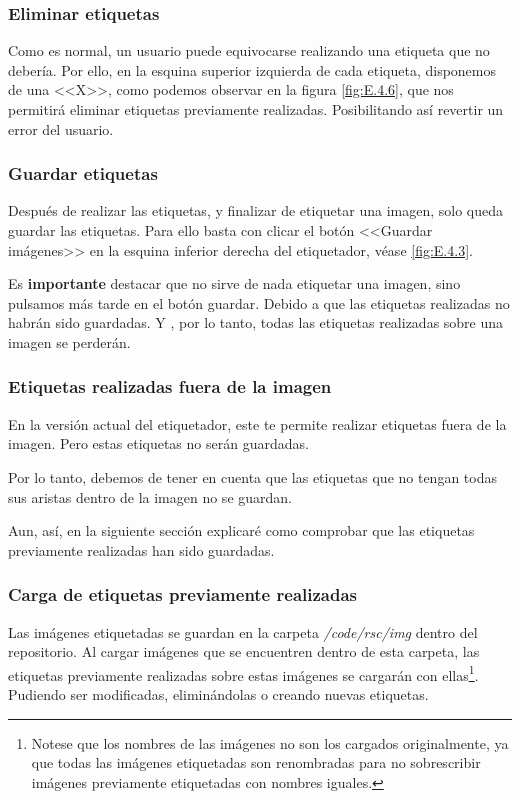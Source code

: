 \subsubsection{Eliminar etiquetas}

Como es normal, un usuario puede equivocarse realizando una etiqueta que no debería. Por ello, en la esquina superior izquierda de cada etiqueta, disponemos de una \textrm{<<X>>}, como podemos observar en la figura \ref{fig:E.4.6}, que nos permitirá eliminar etiquetas previamente realizadas. Posibilitando así revertir un error del usuario.

\subsubsection{Guardar etiquetas}
Después de realizar las etiquetas, y finalizar de etiquetar una imagen, solo queda guardar las etiquetas. Para ello basta con clicar el botón \textrm{<<Guardar imágenes>>} en la esquina inferior derecha del etiquetador, véase \ref{fig:E.4.3}.

Es \textbf{importante} destacar que no sirve de nada etiquetar una imagen, sino pulsamos más tarde en el botón guardar. Debido a que las etiquetas realizadas no habrán sido guardadas. Y 
, por lo tanto, todas las etiquetas realizadas sobre una imagen se perderán.

\subsubsection{Etiquetas realizadas fuera de la imagen}

En la versión actual del etiquetador, este te permite realizar etiquetas fuera de la imagen. Pero estas etiquetas no serán guardadas.

Por lo tanto, debemos de tener en cuenta que las etiquetas que no tengan todas sus aristas dentro de la imagen no se guardan.

Aun, así, en la siguiente sección explicaré como comprobar que las etiquetas previamente realizadas han sido guardadas.

\subsubsection{Carga de etiquetas previamente realizadas}

Las imágenes etiquetadas se guardan en la carpeta \textit{/code/rsc/img} dentro del repositorio. Al cargar imágenes que se encuentren dentro de esta carpeta, las etiquetas previamente realizadas sobre estas imágenes se cargarán con ellas\footnote{Notese que los nombres de las imágenes no son los cargados originalmente, ya que todas las imágenes etiquetadas son renombradas para no sobrescribir imágenes previamente etiquetadas con nombres iguales.}. Pudiendo ser modificadas, eliminándolas o creando nuevas etiquetas.

